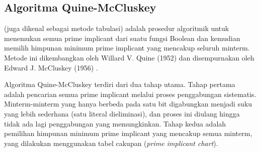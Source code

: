 \subsection{Algoritma Quine-McCluskey}

\begin{definisi}
 (juga dikenal sebagai metode tabulasi) adalah prosedur algoritmik untuk menemukan semua prime implicant dari suatu fungsi Boolean dan kemudian memilih himpunan minimum prime implicant yang mencakup seluruh minterm. Metode ini dikembangkan oleh Willard V. Quine (1952) dan disempurnakan oleh Edward J. McCluskey (1956) \cite{wiki_quine_mccluskey}.
\end{definisi}

Algoritma Quine-McCluskey terdiri dari dua tahap utama. Tahap pertama adalah pencarian semua prime implicant melalui proses penggabungan sistematis. Minterm-minterm yang hanya berbeda pada satu bit digabungkan menjadi suku yang lebih sederhana (satu literal dieliminasi), dan proses ini diulang hingga tidak ada lagi penggabungan yang memungkinkan. Tahap kedua adalah pemilihan himpunan minimum prime implicant yang mencakup semua minterm, yang dilakukan menggunakan tabel cakupan (\textit{prime implicant chart}).

